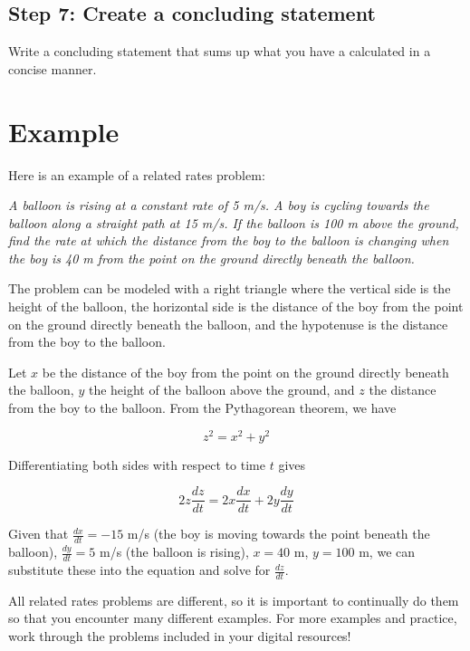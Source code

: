 \subsection{Step 7: Create a concluding statement}
Write a concluding statement that sums up what you have a calculated in a concise manner. 
\section{Example}

Here is an example of a related rates problem:

\textit{A balloon is rising at a constant rate of 5 m/s. A boy is cycling towards the balloon along a straight path at 15 m/s. If the balloon is 100 m above the ground, find the rate at which the distance from the boy to the balloon is changing when the boy is 40 m from the point on the ground directly beneath the balloon.}

The problem can be modeled with a right triangle where the vertical side is the height of the balloon, the horizontal side is the distance of the boy from the point on the ground directly beneath the balloon, and the hypotenuse is the distance from the boy to the balloon.

Let $x$ be the distance of the boy from the point on the ground directly beneath the balloon, $y$ the height of the balloon above the ground, and $z$ the distance from the boy to the balloon. From the Pythagorean theorem, we have 

\begin{equation}
z^2 = x^2 + y^2
\end{equation}

Differentiating both sides with respect to time $t$ gives

\begin{equation}
2z \frac{dz}{dt} = 2x \frac{dx}{dt} + 2y \frac{dy}{dt}
\end{equation}

Given that $\frac{dx}{dt} = -15$ m/s (the boy is moving towards the point beneath the balloon), $\frac{dy}{dt} = 5$ m/s (the balloon is rising), $x=40$ m, $y=100$ m, we can substitute these into the equation and solve for $\frac{dz}{dt}$.


All related rates problems are different, so it is important to continually do them so that you encounter many different examples. For more examples and practice, work through the problems included in your digital resources!